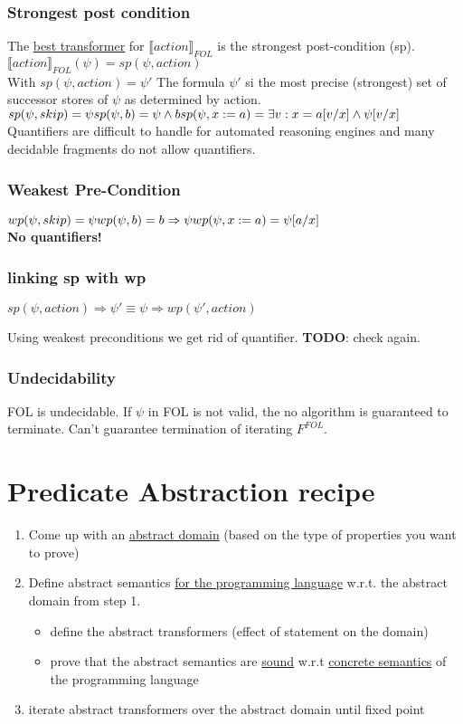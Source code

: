 \subsubsection{Strongest post condition}
The \underline{best transformer} for $\llbracket action \rrbracket_{FOL}$ is the strongest post-condition (sp).\\
$\llbracket action \rrbracket_{FOL}(\psi) = sp(\psi, action)$\\
With $sp(\psi, action) = \psi'$ The formula $\psi'$ si the most precise (strongest) set of successor stores of $\psi$ as determined by action.\\
$sp(\psi, skip) = \psi\\
sp(\psi, b) = \psi \wedge b\\
sp(\psi, x:=a) = \exists v:x=a[v/x] \wedge \psi[v/x]$\\
Quantifiers are difficult to handle for automated reasoning engines and many decidable fragments do not allow quantifiers.
\subsubsection{Weakest Pre-Condition}
$wp(\psi, skip) = \psi\\ wp(\psi,b) = b \Rightarrow \psi\\ wp(\psi, x:=a) = \psi[a/x]$\\
\textbf{No quantifiers!}
\subsubsection{linking sp with wp}
\begin{theorem}
$sp(\psi, action) \Rightarrow \psi' \equiv \psi \Rightarrow wp(\psi', action)$
\end{theorem}
Using weakest preconditions we get rid of quantifier. \textbf{TODO}: check again. 
\subsubsection{Undecidability}
FOL is undecidable. If $\psi$ in FOL is not valid, the no algorithm is guaranteed to terminate. Can't guarantee termination of iterating $F^{FOL}$.
\section{Predicate Abstraction recipe}
\begin{enumerate}
\item Come up with an \underline{abstract domain} (based on the type of properties you want to prove)
\item Define abstract semantics \underline{for the programming language} w.r.t. the abstract domain from step 1.
\begin{itemize}
\item define the abstract transformers (effect of statement on the domain)
\item prove that the abstract semantics are \underline{sound} w.r.t \underline{concrete semantics} of the programming language
\end{itemize}
\item iterate abstract transformers over the abstract domain until fixed point
\end{enumerate}
